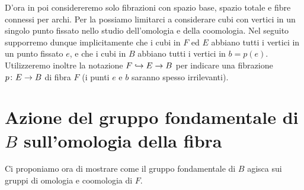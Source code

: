 D'ora in poi considereremo solo fibrazioni con spazio base, spazio totale e fibre connessi per archi. Per la  possiamo limitarci a considerare cubi con vertici in un singolo punto fissato nello studio dell'omologia e della coomologia. Nel seguito supporremo dunque implicitamente che i cubi in $F$ ed $E$ abbiano tutti i vertici in un punto fissato $e$, e che i cubi in $B$ abbiano tutti i vertici in $b=p(e)$. Utilizzeremo inoltre la notazione $F\hookrightarrow E\to B$ per indicare una fibrazione $\map{p}{E}{B}$ di fibra $F$ (i punti $e$ e $b$ saranno spesso irrilevanti).

\section{Azione del gruppo fondamentale di \texorpdfstring{$B$}{B} sull'omologia della fibra}

Ci proponiamo ora di mostrare come il gruppo fondamentale di $B$ agisca sui gruppi di omologia e coomologia di $F$.

